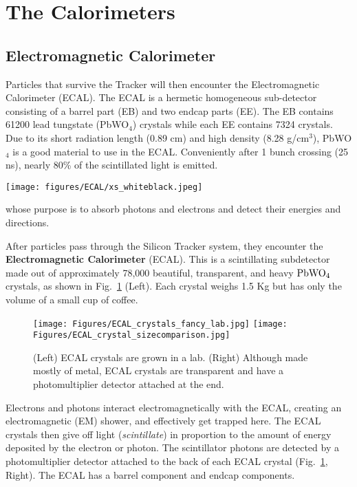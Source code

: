 \section{The Calorimeters}
\label{sec:calo}

\subsection{Electromagnetic Calorimeter}

Particles that survive the Tracker will then encounter the Electromagnetic Calorimeter (ECAL).
The ECAL is a hermetic homogeneous sub-detector consisting of a barrel part (EB) and two endcap parts (EE).
The EB contains 61200 lead tungstate (PbWO$_4$) crystals while each EE contains 7324 crystals.
Due to its short radiation length (0.89 cm) and high density (8.28 g/cm$^3$),
PbWO$_4$ is a good material to use in the ECAL.
Conveniently after 1 bunch crossing (25 ns), nearly 80\% of the scintillated light is emitted.

\begin{figure*}[!htb]
    \centering
    \captionsetup{justification=justified}
    \texttt{[image: figures/ECAL/xs\_whiteblack.jpeg]}
    \caption{Cross sectional view of the electromagnetic calorimeter of CMS.
             Figure taken from Ref.~\cite{jinst:cms_exp}.}
    \label{fig:ecal_xs}
\end{figure*}

whose purpose is to absorb photons and electrons and detect their energies and directions.

After particles pass through the Silicon Tracker system, they encounter the {\bf Electromagnetic Calorimeter} (ECAL). 
This is a scintillating subdetector made out of approximately 78,000 beautiful, transparent, and heavy ${\rm PbWO_{4}}$ crystals, as shown in Fig.~\ref{fig:ecal_crystals} (Left).
Each crystal weighs 1.5 Kg but has only the volume of a small cup of coffee. 

\begin{figure}[pbth]
\centering
\texttt{[image: Figures/ECAL\_crystals\_fancy\_lab.jpg]}
\texttt{[image: Figures/ECAL\_crystal\_sizecomparison.jpg]}
    \caption{
    (Left) ECAL crystals are grown in a lab.
    (Right) Although made mostly of metal, ECAL crystals are transparent and have a photomultiplier detector attached at the end.} 
    \label{fig:ecal_crystals}
\end{figure}
Electrons and photons interact electromagnetically with the ECAL, creating an electromagnetic (EM) shower, and effectively get trapped here.
The ECAL crystals then give off light (\emph{scintillate}) in proportion to the amount of energy deposited by the electron or photon. 
The scintillator photons are detected by a photomultiplier detector attached to the back of each ECAL crystal (Fig.~\ref{fig:ecal_crystals}, Right).
The ECAL has a barrel component and endcap components.

